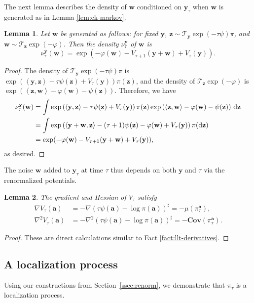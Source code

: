\documentclass[11pt]{article}
\newtheorem{lemma}{Lemma}
\newcommand{\inprod}[2]{\left\langle#1, #2\right\rangle}
\newcommand{\dd}{\textup{d}}
\newcommand{\Par}[1]{\left(#1\right)}
\newcommand{\Cov}{\mathbf{Cov}}
\newcommand{\0}{\mathbf{0}}
\newcommand{\1}{\mathbf{1}}
\newcommand{\va}{\mathbf{a}}
\newcommand{\vw}{\mathbf{w}}
\newcommand{\vy}{\mathbf{y}}
\newcommand{\vz}{\mathbf{z}}
\begin{document}
The next lemma describes the density of $\vw$ conditioned on $\vy_\tau$ when $\vw$ is generated as in Lemma \ref{lem:ck-markov}.

\begin{lemma}\label{lem:muk}
    Let $\vw$ be generated as follows: for fixed $\vy$, $\vz\sim \mathcal{T}_{\vy}\exp(-\tau\psi)\pi$, and $\vw\sim \mathcal{T}_{\vz}\exp(-\varphi)$.  Then the  density $\nu^\vy_\tau$ of $\vw$ is
    \[\nu^\vy_\tau(\vw)=\exp(-\varphi(\vw)-V_{\tau+1}(\vy+\vw)+V_\tau(\vy)).\]
\end{lemma}
\begin{proof}
    The density of $\mathcal{T}_{\vy}\exp(-\tau\psi)\pi$ is $\exp\Par{\inprod{\vy}{\vz}-\tau\psi(\vz)+V_{\tau}(\vy)}\pi(\vz)$, and the density of $\mathcal{T}_{\vz}\exp(-\varphi)$ is $\exp\Par{\inprod{\vz}{\vw}-\varphi(\vw)-\psi(\vz)}$.  Therefore, we have
    \begin{align*}
        \nu^\vy_\tau(\vw)
        &=\int \exp\Par{\inprod{\vy}{\vz}-\tau\psi(\vz)+V_{\tau}(\vy)}\pi(\vz)\exp\Par{\inprod{\vz}{\vw}-\varphi(\vw)-\psi(\vz)}\,\dd\vz\\
        &=\int \exp\Par{\inprod{\vy+\vw}{\vz}-(\tau+1)\psi(\vz)-\varphi(\vw)+V_\tau(\vy)}\pi(\dd\vz)\\
        &=\exp(-\varphi(\vw)-V_{\tau+1}(\vy+\vw)+V_\tau(\vy)),
    \end{align*}
    as desired.
\end{proof}

The noise $\vw$ added to $\vy_\tau$ at time $\tau$ thus depends on both $\vy$ and $\tau$ via the renormalized potentials.

\begin{lemma}\label{lem:renorm-potential-derivatives}
    The gradient and Hessian of $V_\tau$ satisfy
    \begin{align*}
        \nabla V_\tau(\va)&=-\nabla (\tau\psi(\va)-\log\pi(\va))^{\sharp}=-\mu(\pi_\tau^\va),\\
        \nabla^2 V_{\tau}(\va)&=-\nabla^2 (\tau\psi(\va)-\log\pi(\va))^{\sharp}=-\Cov(\pi_\tau^\va).
    \end{align*}
\end{lemma}
\begin{proof}
    These are direct calculations similar to Fact \ref{fact:llt-derivatives}.
\end{proof}



\subsection{A localization process}
Using our constructions from Section~\ref{ssec:renorm}, we demonstrate that $\pi_\tau$ is a localization process.
\end{document}
